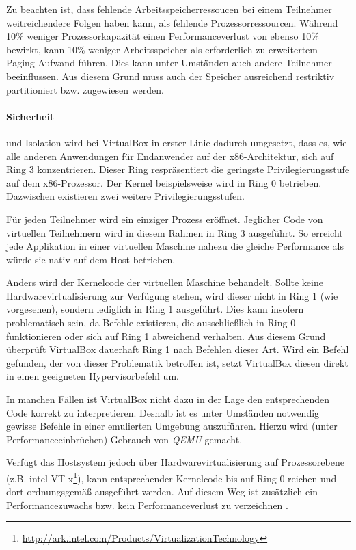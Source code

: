 Zu beachten ist, dass fehlende Arbeitsspeicherressoucen bei einem Teilnehmer weitreichendere Folgen
haben kann, als fehlende Prozessorressourcen. Während 10\% weniger Prozessorkapazität einen
Performanceverlust von ebenso 10\% bewirkt, kann 10\% weniger Arbeitsspeicher als erforderlich zu
erweitertem Paging-Aufwand führen. Dies kann unter Umständen auch andere Teilnehmer beeinflussen.
Aus diesem Grund muss auch der Speicher ausreichend restriktiv partitioniert bzw. zugewiesen werden.

\paragraph{Sicherheit} und Isolation wird bei VirtualBox in erster Linie dadurch umgesetzt, dass
es, wie alle anderen Anwendungen für Endanwender auf der x86-Architektur, sich auf Ring 3 konzentrieren.
Dieser Ring respräsentiert die geringste Privilegierungsstufe auf dem x86-Prozessor. Der Kernel
beispielsweise wird in Ring 0 betrieben. Dazwischen existieren zwei weitere Privilegierungsstufen.

Für jeden Teilnehmer wird ein einziger Prozess eröffnet. Jeglicher Code von virtuellen Teilnehmern
wird in diesem Rahmen in Ring 3 ausgeführt. So erreicht jede Applikation in einer virtuellen Maschine
nahezu die gleiche Performance als würde sie nativ auf dem Host betrieben.

Anders wird der Kernelcode der virtuellen Maschine behandelt. Sollte keine Hardwarevirtualisierung
zur Verfügung stehen, wird dieser nicht in Ring 1 (wie vorgesehen), sondern lediglich in Ring 1
ausgeführt. Dies kann insofern problematisch sein, da Befehle existieren, die ausschließlich
in Ring 0 funktionieren oder sich auf Ring 1 abweichend verhalten. Aus diesem Grund überprüft
VirtualBox dauerhaft Ring 1 nach Befehlen dieser Art. Wird ein Befehl gefunden, der von dieser
Problematik betroffen ist, setzt VirtualBox diesen direkt in einen geeigneten Hypervisorbefehl
um.

In manchen Fällen ist VirtualBox nicht dazu in der Lage den entsprechenden Code korrekt zu
interpretieren. Deshalb ist es unter Umständen notwendig gewisse Befehle in einer
emulierten Umgebung auszuführen. Hierzu wird (unter Performanceeinbrüchen) Gebrauch von
\textit{QEMU} gemacht. 

Verfügt das Hostsystem jedoch über Hardwarevirtualisierung auf Prozessorebene 
(z.B. intel VT-x\footnote{\url{http://ark.intel.com/Products/VirtualizationTechnology}}),
kann entsprechender Kernelcode bis auf Ring 0 reichen und dort ordnungsgemäß ausgeführt werden.
Auf diesem Weg ist zusätzlich
ein Performancezuwachs bzw. kein Performanceverlust zu verzeichnen \cite{victor10}.

